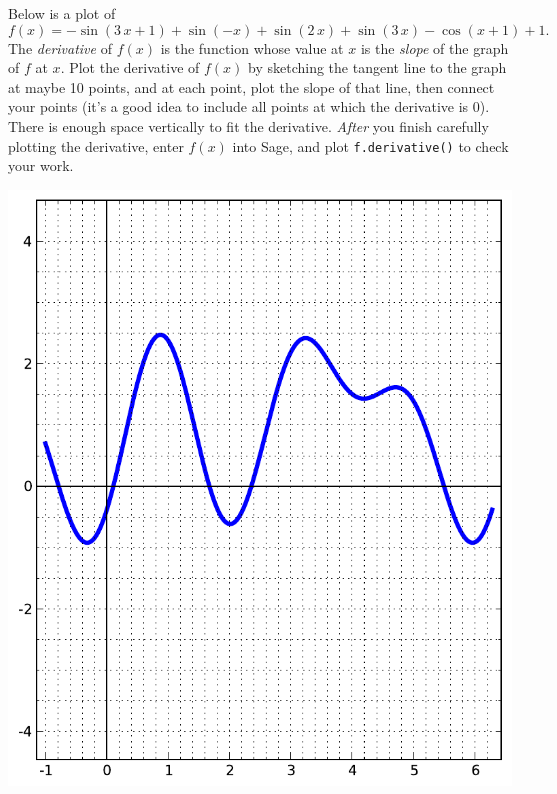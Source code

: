 Below is a plot of $$f(x)=-\sin\left(3 \, x + 1\right) + \sin\left(-x\right) + \sin\left(2 \, x\right) + \sin\left(3 \, x\right) - \cos\left(x + 1\right) + 1.$$  The {\em \color{red}derivative} of $f(x)$ is the function whose value at $x$ is the {\em slope} of the graph of $f$ at $x$.  Plot the derivative of $f(x)$ by sketching the tangent line to the graph at maybe 10 points, and at each point, plot the slope of that line, then connect your points (it's a good idea to include all points at which the derivative is 0).  There is enough space vertically to fit the derivative.  {\em After} you finish carefully plotting the derivative, enter $f(x)$ into Sage, and plot {\color{blue}\verb|f.derivative()|} to check your work.
\begin{center}\includegraphics{functions/68.pdf}\end{center}\newpage

